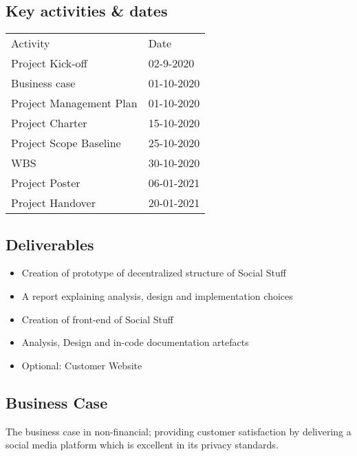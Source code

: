 \subsection{Key activities \& dates}\label{subsec:key-activities-and-dates}

\begin{table}[]
    \begin{tabular}{ll}
        Activity                & Date       \\
        Project Kick-off        & 02-9-2020  \\
        Business case           & 01-10-2020 \\
        Project Management Plan & 01-10-2020 \\
        Project Charter         & 15-10-2020 \\
        Project Scope Baseline  & 25-10-2020 \\
        WBS                     & 30-10-2020 \\
        Project Poster          & 06-01-2021 \\
        Project Handover        & 20-01-2021
    \end{tabular}\label{tab:table2}
\end{table}

\subsection{Deliverables}\label{subsec:deliverables}

\begin{itemize}
    \item Creation of prototype of decentralized structure of Social Stuff
    \item A report explaining analysis, design and implementation choices
    \item Creation of front-end of Social Stuff
    \item Analysis, Design and in-code documentation artefacts
    \item Optional: Customer Website
\end{itemize}

\subsection{Business Case}

The business case in non-financial;
providing customer satisfaction by delivering a social media platform which is excellent in its privacy standards.

